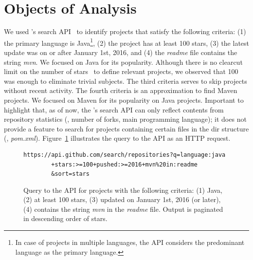 \section{Objects of Analysis}
\label{sec:subjects}

We used \github{}'s search API~\cite{githubsearch} to identify
projects that satisfy the following criteria: (1) the primary language
is Java\footnote{In case of projects in multiple languages, the
  \github{} API considers the predominant language as the primary
  language.}, (2) the project has at least 100 stars, (3) the latest
update was on or after January 1st, 2016, and (4) the \emph{readme}
file contains the string \emph{mvn}.  We focused on Java for its
popularity.  Although there is no clearcut limit on the number of
\github{} stars~\cite{github-stars} to define relevant projects, we
observed that 100 was enough to eliminate trivial subjects. The third
criteria serves to skip projects without recent activity. The fourth
criteria is an approximation to find Maven projects. We focused on Maven for its popularity on
Java projects.  Important to highlight that, as of now, the
\github{}'s search API can only reflect contents from repository
statistics (\eg, number of forks, main programming language); it does
not provide a feature to search for projects containing certain files
in the dir structure (\eg{}, \emph{pom.xml}).
Figure~\ref{fig:subject-query} illustrates the query to the \github{}
API as an HTTP request.  

\vspace{1ex}
\begin{figure}[h!]
\centering
\scriptsize
{}
\begin{lstlisting}
https://api.github.com/search/repositories?q=language:java
        +stars:>=100+pushed:>=2016+mvn%20in:readme
        &sort=stars
\end{lstlisting}
  \caption{\label{fig:subject-query} Query to the \github{} API for
  projects with the following criteria: (1) Java, (2) at least 100
  stars, (3) updated on January 1st, 2016 (or later), (4) contains
  the string \emph{mvn} in the \emph{readme} file. Output is
  paginated in descending order of stars.}
\end{figure}

